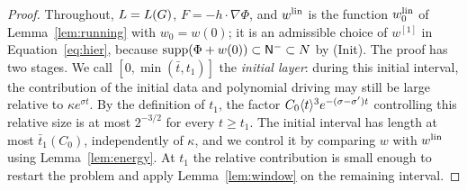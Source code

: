 \begin{proof}
Throughout,
$L=L(G)$, $F=-h\cdot\nabla\Phi$, and $w^{\mathrm{lin}}$ is the function $w^{\mathrm{lin}}_0$ of
Lemma~\ref{lem:running} with $w_0=w(0)$; it is an admissible choice of $w^{[1]}$
in Equation~\eqref{eq:hier}, because $\operatorname{supp}(\Phi+w(0))\subset\mathsf{N}^{-}\subset N$ by
(Init). The proof has two stages. We call $[0,\min(\bar t,t_1)]$ the
\emph{initial layer}: during this initial interval, the contribution of the
initial data and polynomial driving may still be large relative to
$\kappa e^{\sigma t}$. By the definition of $t_1$, the factor
$C_0\langle t\rangle^3e^{-(\sigma-\sigma')t}$ controlling this relative size is at most
$2^{-3/2}$ for every $t\ge t_1$.
The initial interval has length at most $\bar t_1(C_0)$, independently of
$\kappa$, and we control it by comparing $w$ with $w^{\mathrm{lin}}$ using
Lemma~\ref{lem:energy}. At $t_1$ the relative contribution is small enough
to restart the problem and apply Lemma~\ref{lem:window} on the remaining interval.


\end{proof}
